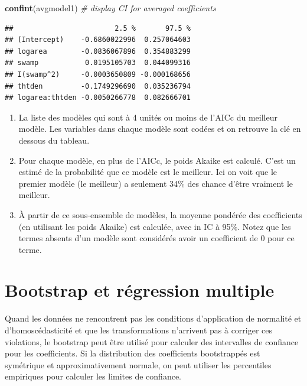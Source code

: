 \documentclass[
  12pt,
]{book}
\newenvironment{Shaded}{\begin{snugshade}}{\end{snugshade}}
\newcommand{\CommentTok}[1]{\textcolor[rgb]{0.56,0.35,0.01}{\textit{#1}}}
\newcommand{\KeywordTok}[1]{\textcolor[rgb]{0.13,0.29,0.53}{\textbf{#1}}}
\newcommand{\NormalTok}[1]{#1}
\providecommand{\tightlist}{%
  \setlength{\itemsep}{0pt}\setlength{\parskip}{0pt}}
\begin{document}
\begin{Shaded}
\begin{Highlighting}[]
\KeywordTok{confint}\NormalTok{(avgmodel1) }\CommentTok{\# display CI for averaged coefficients}
\end{Highlighting}
\end{Shaded}

\begin{verbatim}
##                        2.5 %       97.5 %
## (Intercept)    -0.6860022996  0.257064603
## logarea        -0.0836067896  0.354883299
## swamp           0.0195105703  0.044099316
## I(swamp^2)     -0.0003650809 -0.000168656
## thtden         -0.1749296690  0.035236794
## logarea:thtden -0.0050266778  0.082666701
\end{verbatim}

\begin{enumerate}
\def\labelenumi{\arabic{enumi}.}
\tightlist
\item
  La liste des modèles qui sont à 4 unités ou moins de l'AICc du meilleur modèle. Les variables dans chaque modèle sont codées et on retrouve la clé en dessous du tableau.
\item
  Pour chaque modèle, en plus de l'AICc, le poids Akaike est calculé. C'est un estimé de la probabilité que ce modèle est le meilleur. Ici on voit que le premier modèle (le meilleur) a seulement 34\% des chance d'être vraiment le meilleur.
\item
  À partir de ce sous-ensemble de modèles, la moyenne pondérée des coefficients (en utilisant les poids Akaike) est calculée, avec in IC à 95\%. Notez que les termes absents d'un modèle sont considérés avoir un coefficient de 0 pour ce terme.
\end{enumerate}

\hypertarget{bootstrap-et-ruxe9gression-multiple}{%
\section{Bootstrap et régression multiple}\label{bootstrap-et-ruxe9gression-multiple}}

Quand les données ne rencontrent pas les conditions d'application de normalité et d'homoscédasticité et que les transformations n'arrivent pas à corriger ces violations, le bootstrap peut être utilisé pour calculer des intervalles de confiance pour les coefficients. Si la distribution des coefficients bootstrappés est symétrique et approximativement normale, on peut utiliser les percentiles empiriques pour calculer les limites de confiance.
\end{document}
